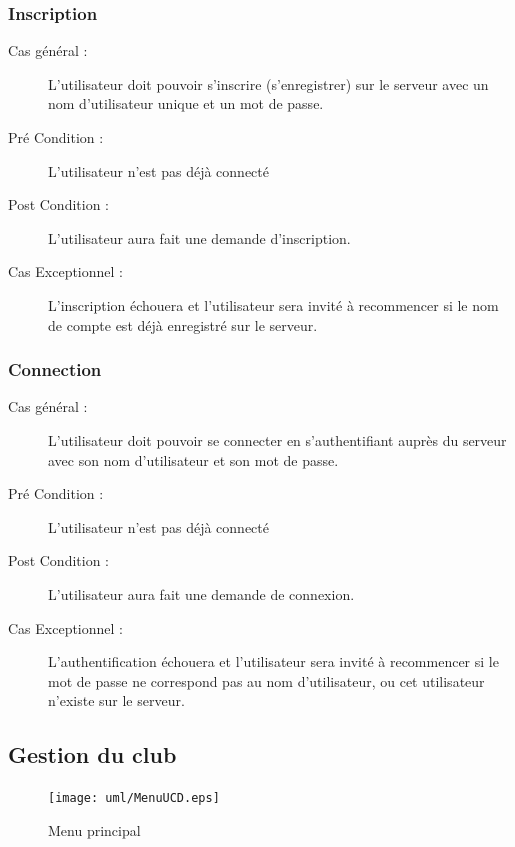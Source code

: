\documentclass[a4paper]{report}
\begin{document}
\subsubsection{Inscription}

\begin{description}
    \item[Cas général  :] L'\gls{utilisateur} doit pouvoir s'inscrire (s'enregistrer) sur le \gls{serveur} avec un nom d'\gls{utilisateur} unique et un mot de passe.
    \item[Pré Condition  :] L'\gls{utilisateur} n'est pas déjà connecté
    \item[Post Condition :] L'\gls{utilisateur} aura fait une demande d'inscription.
    \item[Cas Exceptionnel :] L'inscription échouera et l'\gls{utilisateur} sera invité à recommencer si le nom de compte est déjà enregistré sur le \gls{serveur}.
\end{description}

\subsubsection{Connection}
\begin{description}
    \item[Cas général :] L'\gls{utilisateur} doit pouvoir se connecter en s'authentifiant auprès du \gls{serveur} avec son nom d'\gls{utilisateur} et son mot de passe.
    \item[Pré Condition  :] L'\gls{utilisateur} n'est pas déjà connecté
    \item[Post Condition :] L'\gls{utilisateur} aura fait une demande de connexion.
    \item[Cas Exceptionnel :] L'authentification échouera et l'\gls{utilisateur} sera invité à recommencer si le mot de passe ne correspond pas au nom d'\gls{utilisateur}, ou cet \gls{utilisateur} n'existe sur le \gls{serveur}.
\end{description}

\subsection{Gestion du club}

\begin{figure}[H]
    \begin{center}
        \texttt{[image: uml/MenuUCD.eps]}
        \caption{Menu principal}
    \end{center}
\end{figure}
\end{document}
